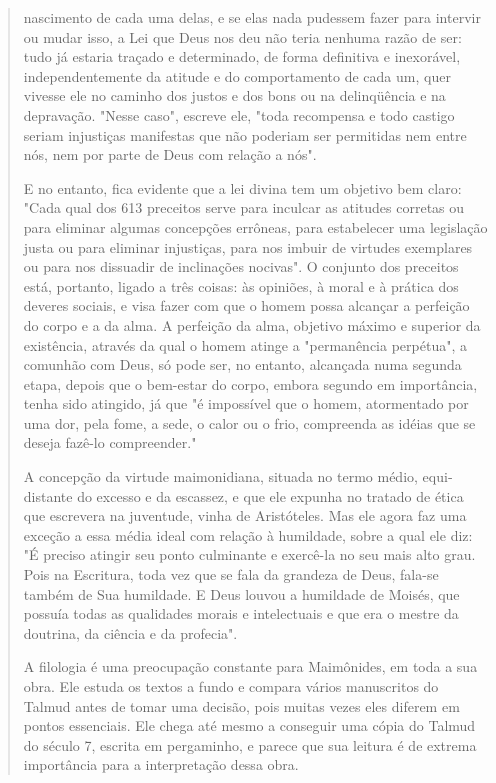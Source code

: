 \begin{quote}
nascimento de cada uma delas, e se elas nada pudessem fazer para
intervir ou mudar isso, a Lei que Deus nos deu não teria nenhuma razão
de ser: tudo já estaria traçado e determinado, de forma definitiva e
inexorável, independente­mente da atitude e do comportamento de cada um,
quer vivesse ele no cami­nho dos justos e dos bons ou na delinqüência e
na depravação. "Nesse caso", escreve ele, "toda recompensa e todo
castigo seriam injustiças manifestas que não poderiam ser permitidas nem
entre nós, nem por parte de Deus com rela­ção a nós".

E no entanto, fica evidente que a lei divina tem um objetivo bem claro:
"Cada qual dos 613 preceitos serve para inculcar as atitudes corretas ou
para eliminar algumas concepções errôneas, para estabelecer uma
legislação justa ou para eliminar injustiças, para nos imbuir de
virtudes exemplares ou para nos dissuadir de inclinações nocivas". O
conjunto dos preceitos está, portanto, li­gado a três coisas: às
opiniões, à moral e à prática dos deveres sociais, e visa fazer com que
o homem possa alcançar a perfeição do corpo e a da alma. A perfeição da
alma, objetivo máximo e superior da existência, através da qual o homem
atinge a "permanência perpétua", a comunhão com Deus, só pode ser, no
entanto, alcançada numa segunda etapa, depois que o bem-estar do cor­po,
embora segundo em importância, tenha sido atingido, já que "é impossível
que o homem, atormentado por uma dor, pela fome, a sede, o calor ou o
frio, compreenda as idéias que se deseja fazê-lo compreender."

A concepção da virtude maimonidiana, situada no termo médio,
equi­distante do excesso e da escassez, e que ele expunha no tratado de
ética que escrevera na juventude, vinha de Aristóteles. Mas ele agora
faz uma exceção a essa média ideal com relação à humildade, sobre a qual
ele diz: "É preciso atingir seu ponto culminante e exercê-la no seu mais
alto grau. Pois na Escritu­ra, toda vez que se fala da grandeza de Deus,
fala-se também de Sua humildade. E Deus louvou a humildade de Moisés,
que possuía todas as qualidades morais e intelectuais e que era o mestre
da doutrina, da ciência e da profecia".

A filologia é uma preocupação constante para Maimônides, em toda a sua
obra. Ele estuda os textos a fundo e compara vários manuscritos do
Talmud antes de tomar uma decisão, pois muitas vezes eles diferem em
pontos essen­ciais. Ele chega até mesmo a conseguir uma cópia do Talmud
do século 7, es­crita em pergaminho, e parece que sua leitura é de
extrema importância para a interpretação dessa obra.


\end{quote}
